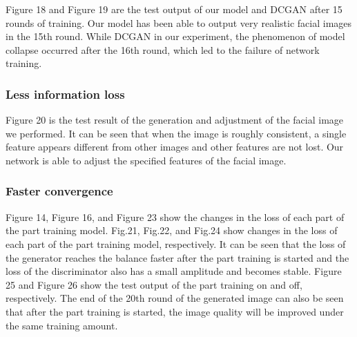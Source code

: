 Figure 18 and Figure 19 are the test output of our model and DCGAN after 15 rounds of training.
Our model has been able to output very realistic facial images in the 15th round.
While DCGAN in our experiment, the phenomenon of model collapse occurred after the 16th round, which led to the failure of network training.

\subsubsection*{Less information loss}
Figure 20 is the test result of the generation and adjustment of the facial image we performed.
It can be seen that when the image is roughly consistent, a single feature appears different from other images and other features are not lost.
Our network is able to adjust the specified features of the facial image.

\subsubsection*{Faster convergence}
Figure 14, Figure 16, and Figure 23 show the changes in the loss of each part of the part training model.
Fig.21, Fig.22, and Fig.24 show changes in the loss of each part of the part training model, respectively.
It can be seen that the loss of the generator reaches the balance faster after the part training is started and the loss of the discriminator also has a small amplitude and becomes stable.
Figure 25 and Figure 26 show the test output of the part training on and off, respectively.
The end of the 20th round of the generated image can also be seen that after the part training is started, the image quality will be improved under the same training amount.

